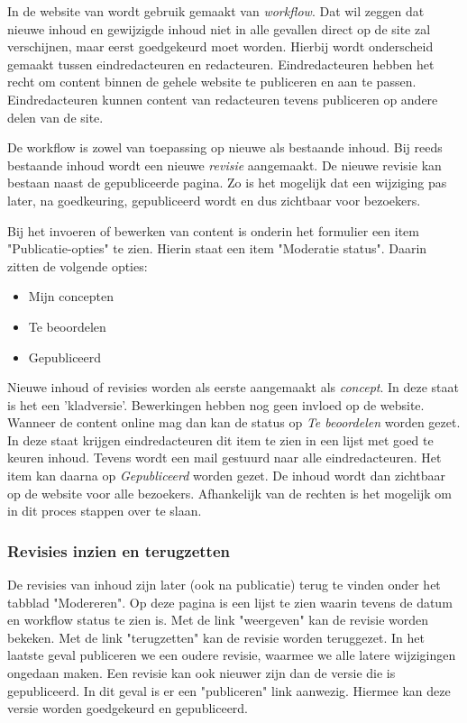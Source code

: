In de website van \drupalpath wordt gebruik gemaakt van \emph{workflow}. Dat wil zeggen dat nieuwe inhoud en gewijzigde inhoud niet in alle gevallen direct op de site zal verschijnen, maar eerst goedgekeurd moet worden. Hierbij wordt onderscheid gemaakt tussen eindredacteuren en redacteuren. Eindredacteuren hebben het recht om content binnen de gehele website te publiceren en aan te passen. Eindredacteuren kunnen content van redacteuren tevens publiceren op andere delen van de site.

De workflow is zowel van toepassing op nieuwe als bestaande inhoud. Bij reeds bestaande inhoud wordt een nieuwe \emph{revisie} aangemaakt. De nieuwe revisie kan bestaan naast de gepubliceerde pagina. Zo is het mogelijk dat een wijziging pas later, na goedkeuring, gepubliceerd wordt en dus zichtbaar voor bezoekers.

Bij het invoeren of bewerken van content is onderin het formulier een item "Publicatie-opties" te zien. Hierin staat een item "Moderatie status". Daarin zitten de volgende opties:
\begin{itemize}
\item Mijn concepten
\item Te beoordelen
\item Gepubliceerd
\end{itemize}

Nieuwe inhoud of revisies worden als eerste aangemaakt als \emph{concept}. In deze staat is het een 'kladversie'. Bewerkingen hebben nog geen invloed op de website. Wanneer de content online mag dan kan de status op \emph{Te beoordelen} worden gezet. In deze staat krijgen eindredacteuren dit item te zien in een lijst met goed te keuren inhoud. Tevens wordt een mail gestuurd naar alle eindredacteuren. Het item kan daarna op \emph{Gepubliceerd} worden gezet. De inhoud wordt dan zichtbaar op de website voor alle bezoekers. Afhankelijk van de rechten is het mogelijk om in dit proces stappen over te slaan.

\subsubsection{Revisies inzien en terugzetten}\label{modererentab}

De revisies van inhoud zijn later (ook na publicatie) terug te vinden onder het tabblad "Modereren". Op deze pagina is een lijst te zien waarin tevens de datum en workflow status te zien is. Met de link "weergeven" kan de revisie worden bekeken. Met de link "terugzetten" kan de revisie worden teruggezet. In het laatste geval publiceren we een oudere revisie, waarmee we alle latere wijzigingen ongedaan maken. Een revisie kan ook nieuwer zijn dan de versie die is gepubliceerd. In dit geval is er een "publiceren" link aanwezig. Hiermee kan deze versie worden goedgekeurd en gepubliceerd.

